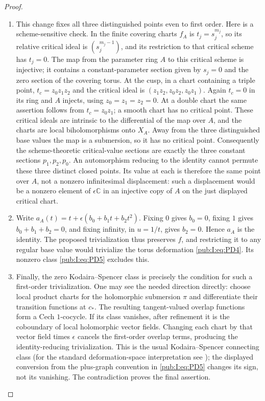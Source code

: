 \begin{proof}
\begin{enumerate}[label=\arabic*.,leftmargin=*]
\item This change fixes all three distinguished points even to first order.
Here is a scheme-sensitive check. In the finite covering charts
$f_A$ is $t_j=s_j^{m_j}$, so its relative critical ideal is
$(s_j^{m_j-1})$, and its restriction to that critical scheme has
$t_j=0$. The map from the parameter ring $A$ to this critical
scheme is injective; it contains a constant-parameter section given
by $s_j=0$ and the zero section of the covering torus.
At the cusp, in a chart containing a triple point,
$t_c=z_0z_1z_2$ and the critical ideal is
$(z_1z_2,z_0z_2,z_0z_1)$. Again $t_c=0$ in its ring and $A$ injects,
using $z_0=z_1=z_2=0$. At a double chart the same assertion follows
from $t_c=z_0z_1$; a smooth chart has no critical point.
These critical ideals are intrinsic to the differential of the map
over $A$, and the charts are local biholomorphisms onto $X_A$.
Away from the three distinguished base values the map is a
submersion, so it has no critical point.
Consequently the scheme-theoretic critical-value sections are exactly
the three constant sections $p_1,p_2,p_0$. An automorphism reducing
to the identity cannot permute these three distinct closed points.
Its value at each is therefore the same point over $A$, not a
nonzero infinitesimal displacement: such a displacement would be a
nonzero element of $\epsilon\mathbb C$ in an injective copy of $A$
on the just displayed critical chart.

\item Write $a_A(t)=t+\epsilon(b_0+b_1t+b_2t^2)$.
Fixing $0$ gives $b_0=0$, fixing $1$ gives $b_0+b_1+b_2=0$,
and fixing infinity, in $u=1/t$, gives $b_2=0$.
Hence $a_A$ is the identity. The proposed trivialization thus
preserves $f$, and restricting it to any regular base value would
trivialize the torus deformation \eqref{pub:I:eq:PD4}. Its nonzero class \eqref{pub:I:eq:PD5}
excludes this.

\item Finally, the zero Kodaira--Spencer class is precisely the condition for
such a first-order trivialization. One may see the needed direction
directly: choose local product charts for the holomorphic submersion
$\pi$ and differentiate their transition functions at $c_*$. The
resulting tangent-valued overlap functions form a Cech $1$-cocycle.
If its class vanishes, after refinement it is the coboundary of local
holomorphic vector fields. Changing each chart by that vector field
times $\epsilon$ cancels the first-order overlap terms, producing
the identity-reducing trivialization. This is the usual
Kodaira--Spencer connecting class (for the standard deformation-space
interpretation see \cite[Section~67, p.~15]{McMullen1996Complex});
the displayed conversion
from the plus-graph convention in \eqref{pub:I:eq:PD5} changes its sign, not its
vanishing. The contradiction proves the final assertion.
\end{enumerate}
\end{proof}
